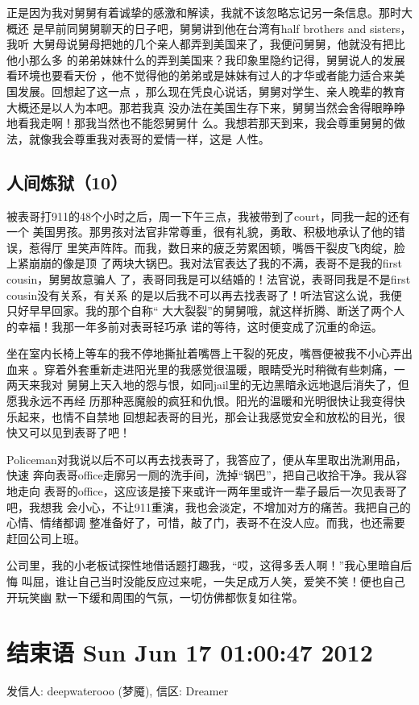 \documentclass[12pt]{book}
\begin{document}
正是因为我对舅舅有着诚挚的感激和解读，我就不该忽略忘记另一条信息。那时大概还
是早前同舅舅聊天的日子吧，舅舅讲到他在台湾有half brothers and sisters，我听
大舅母说舅母把她的几个亲人都弄到美国来了，我便问舅舅，他就没有把比他小那么多
的弟弟妹妹什么的弄到美国来？我印象里隐约记得，舅舅说人的发展看环境也要看天份
，他不觉得他的弟弟或是妹妹有过人的才华或者能力适合来美国发展。回想起了这一点
，那么现在凭良心说话，舅舅对学生、亲人晚辈的教育大概还是以人为本吧。那若我真
没办法在美国生存下来，舅舅当然会舍得眼睁睁地看我走啊！那我当然也不能怨舅舅什
么。我想若那天到来，我会尊重舅舅的做法，就像我会尊重我对表哥的爱情一样，这是
人性。
\section{人间炼狱（10）}
\label{sec-10-10}

被表哥打911的48个小时之后，周一下午三点，我被带到了court，同我一起的还有一个
美国男孩。那男孩对法官非常尊重，很有礼貌，勇敢、积极地承认了他的错误，惹得厅
里笑声阵阵。而我，数日来的疲乏劳累困顿，嘴唇干裂皮飞肉绽，脸上紧崩崩的像是顶
了两块大锅巴。我对法官表达了我的不满，表哥不是我的first cousin，舅舅故意骗人
了，表哥同我是可以结婚的！法官说，表哥同我是不是first cousin没有关系，有关系
的是以后我不可以再去找表哥了！听法官这么说，我便只好早早回家。我的那个自称“
大大裂裂”的舅舅哦，就这样折腾、断送了两个人的幸福！我那一年多前对表哥轻巧承
诺的等待，这时便变成了沉重的命运。

坐在室内长椅上等车的我不停地撕扯着嘴唇上干裂的死皮，嘴唇便被我不小心弄出血来
。穿着外套重新走进阳光里的我感觉很温暖，眼睛受光时稍微有些刺痛，一两天来我对
舅舅上天入地的怨与恨，如同jail里的无边黑暗永远地退后消失了，但愿我永远不再经
历那种恶魔般的疯狂和仇恨。阳光的温暖和光明很快让我变得快乐起来，也情不自禁地
回想起表哥的目光，那会让我感觉安全和放松的目光，很快又可以见到表哥了吧！

Policeman对我说以后不可以再去找表哥了，我答应了，便从车里取出洗涮用品，快速
奔向表哥office走廓另一厕的洗手间，洗掉“锅巴”，把自己收拾干净。我从容地走向
表哥的office，这应该是接下来或许一两年里或许一辈子最后一次见表哥了吧，我想我
会小心，不让911重演，我也会淡定，不增加对方的痛苦。我把自己的心情、情绪都调
整准备好了，可惜，敲了门，表哥不在没人应。而我，也还需要赶回公司上班。

公司里，我的小老板试探性地借话题打趣我，“哎，这得多丢人啊！”我心里暗自后悔
叫屈，谁让自己当时没能反应过来呢，一失足成万人笑，爱笑不笑！便也自己开玩笑幽
默一下缓和周围的气氛，一切仿佛都恢复如往常。
\chapter{结束语 Sun Jun 17 01:00:47 2012}
\label{sec-11}
发信人: deepwaterooo (梦魇), 信区: Dreamer
\end{document}
